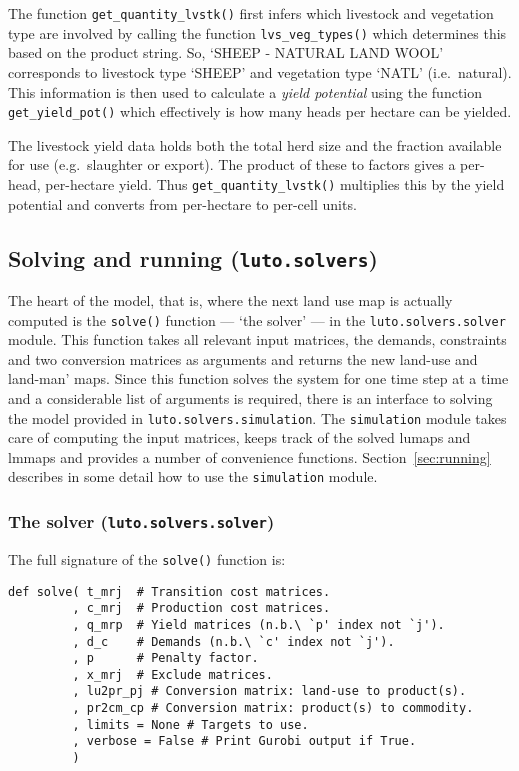 \documentclass{draft}
\begin{document}
The function \texttt{get_quantity_lvstk()} first infers which livestock and vegetation type are involved by calling the function \texttt{lvs_veg_types()} which determines this based on the product string. So, `SHEEP - NATURAL LAND WOOL' corresponds to livestock type `SHEEP' and vegetation type `NATL' (i.e.\ natural). This information is then used to calculate a \emph{yield potential} using the function \texttt{get_yield_pot()} which effectively is how many heads per hectare can be yielded.

The livestock yield data holds both the total herd size and the fraction available for use (e.g.\ slaughter or export). The product of these to factors gives a per-head, per-hectare yield. Thus \texttt{get_quantity_lvstk()} multiplies this by the yield potential and converts from per-hectare to per-cell units.

\subsection{Solving and running (\texttt{luto.solvers})}\label{subsec:solvers}

The heart of the model, that is, where the next land use map is actually computed is the \texttt{solve()} function --- `the solver' --- in the \texttt{luto.solvers.solver} module. This function takes all relevant input matrices, the demands, constraints and two conversion matrices as arguments and returns the new land-use and land-man' maps. Since this function solves the system for one time step at a time and a considerable list of arguments is required, there is an interface to solving the model provided in \texttt{luto.solvers.simulation}. The \texttt{simulation} module takes care of computing the input matrices, keeps track of the solved lumaps and lmmaps and provides a number of convenience functions. Section~\ref{sec:running} describes in some detail how to use the \texttt{simulation} module.

\subsubsection{The solver (\texttt{luto.solvers.solver})}

The full signature of the \texttt{solve()} function is:

\begin{verbatim}
def solve( t_mrj  # Transition cost matrices.
         , c_mrj  # Production cost matrices.
         , q_mrp  # Yield matrices (n.b.\ `p' index not `j').
         , d_c    # Demands (n.b.\ `c' index not `j').
         , p      # Penalty factor.
         , x_mrj  # Exclude matrices.
         , lu2pr_pj # Conversion matrix: land-use to product(s).
         , pr2cm_cp # Conversion matrix: product(s) to commodity.
         , limits = None # Targets to use.
         , verbose = False # Print Gurobi output if True.
         )
\end{verbatim}
\end{document}
